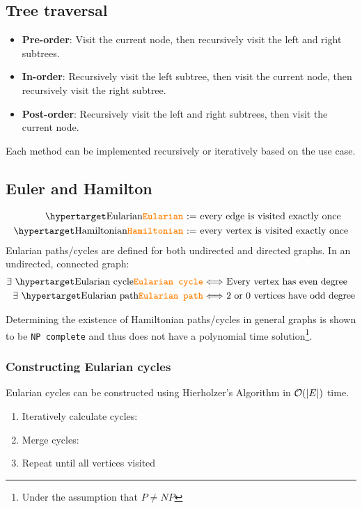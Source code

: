 \documentclass[a3paper, landscape, 11pt]{article} %
\begin{document}
\begin{multicols*}{4}

\hrulefill %

\subsection*{Tree traversal}
\begin{itemize}
\item \textbf{Pre-order}: Visit the current node, then recursively visit the left and right subtrees.
\item \textbf{In-order}: Recursively visit the left subtree, then visit the current node, then recursively visit the right subtree.
\item \textbf{Post-order}: Recursively visit the left and right subtrees, then visit the current node.
\end{itemize}

Each method can be implemented recursively or iteratively based on the use case.

\hrulefill %


\subsection*{Euler and Hamilton}
\begin{align*}
	\text{\keydef{Eularian} := }& \text{every edge is visited exactly once} \\
	\text{\keydef{Hamiltonian} := }& \text{every vertex is visited exactly once}
\end{align*}
Eularian paths/cycles are defined for both undirected and directed graphs. In an undirected, connected graph:
\begin{align*}
	\text{$\exists$ \keydef{Eularian cycle}} \Longleftrightarrow & \text{ Every vertex has even degree} \\
	\text{$\exists$ \keydef{Eularian path}} \Longleftrightarrow & \text{ $2$ or $0$ vertices have odd degree}
\end{align*}	

Determining the existence of Hamiltonian paths/cycles in general graphs is shown to be \texttt{NP complete} and thus does not have a polynomial time solution\footnote{Under the assumption that $P \ne NP$}.

\subsubsection*{Constructing Eularian cycles}
Eularian cycles can be constructed using Hierholzer's Algorithm in $\mathcal{O}(|E|)$ time.
\begin{enumerate}[noitemsep]
	\item Iteratively calculate cycles: 
	\item Merge cycles:
	\item Repeat until all vertices visited
\end{enumerate}


\end{multicols*}
\end{document}
